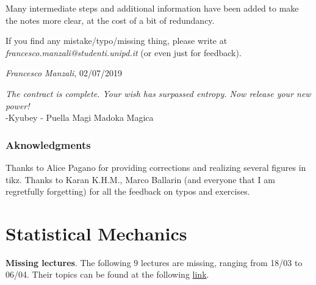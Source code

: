 \documentclass[12pt,a4paper]{report} %
\begin{document}
Many intermediate steps and additional information have been added to make the notes more clear, at the cost of a bit of redundancy.

If you find any mistake/typo/missing thing, please write at \textit{francesco.manzali@studenti.unipd.it} (or even just for feedback).

\begin{flushright}
\textit{Francesco Manzali}, 02/07/2019
\end{flushright}

\begin{flushright}
\textit{The contract is complete. Your wish has surpassed entropy. Now release your new power!}\\
-Kyubey - Puella Magi Madoka Magica
\end{flushright}

\subsection*{Aknowledgments}
Thanks to Alice Pagano for providing corrections and realizing several figures in tikz. Thanks to Karan K.H.M., Marco Ballarin (and everyone that I am regretfully forgetting) for all the feedback on typos and exercises.

\clearpage
            
\restoregeometry

\chapter{Statistical Mechanics}






\danger 
\begin{expl}
        \textbf{Missing lectures}. The following $9$ lectures are missing, ranging from 18/03 to 06/04.  Their topics can be found at the following \href{https://docs.google.com/spreadsheets/d/1H_VqhfWnARh3Nlv6bU2MoWXACttQx0YhCds1guY-hKE/edit?usp=sharing}{link}.
\end{expl}

%
%

%
%
%
%
%
%
%
\end{document}
